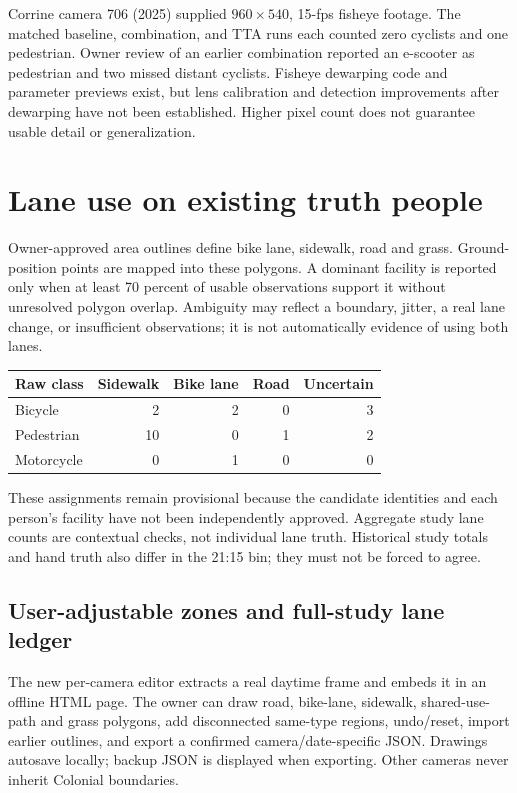 \documentclass[11pt,letterpaper]{article}
\begin{document}
Corrine camera 706 (2025) supplied $960\times540$, 15-fps fisheye footage. The matched baseline, combination, and TTA runs each counted zero cyclists and one pedestrian. Owner review of an earlier combination reported an e-scooter as pedestrian and two missed distant cyclists. Fisheye dewarping code and parameter previews exist, but lens calibration and detection improvements after dewarping have not been established. Higher pixel count does not guarantee usable detail or generalization.

\section{Lane use on existing truth people}
Owner-approved area outlines define bike lane, sidewalk, road and grass. Ground-position points are mapped into these polygons. A dominant facility is reported only when at least 70 percent of usable observations support it without unresolved polygon overlap. Ambiguity may reflect a boundary, jitter, a real lane change, or insufficient observations; it is not automatically evidence of using both lanes.
\begin{center}
\begin{tabular}{lrrrr}
\toprule
Raw class &Sidewalk&Bike lane&Road&Uncertain\\
\midrule
Bicycle &2&2&0&3\\
Pedestrian &10&0&1&2\\
Motorcycle &0&1&0&0\\
\bottomrule
\end{tabular}
\end{center}
These assignments remain provisional because the candidate identities and each person's facility have not been independently approved. Aggregate study lane counts are contextual checks, not individual lane truth. Historical study totals and hand truth also differ in the 21:15 bin; they must not be forced to agree.

\subsection{User-adjustable zones and full-study lane ledger}
The new per-camera editor extracts a real daytime frame and embeds it in an offline HTML page. The owner can draw road, bike-lane, sidewalk, shared-use-path and grass polygons, add disconnected same-type regions, undo/reset, import earlier outlines, and export a confirmed camera/date-specific JSON. Drawings autosave locally; backup JSON is displayed when exporting. Other cameras never inherit Colonial boundaries.
\end{document}
